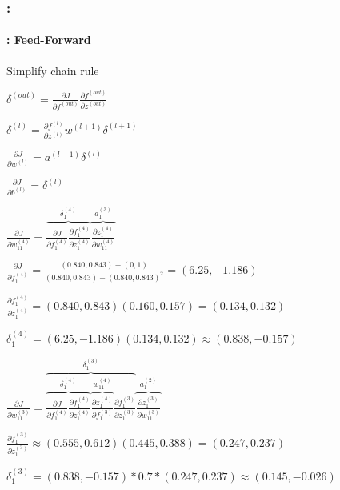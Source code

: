 \documentclass[xcolor=table]{beamer}
\begin{document}
\begin{frame}
	\frametitle{\insertshortsubtitle: \insertsection}
	\framesubtitle{\insertsubsection: Feed-Forward}
	
	\begin{minipage}{0.3\textwidth}
		\small
		
		Simplify chain rule\boldmath
		
		$ \delta^{(out)} = \frac{\partial J}{\partial f^{(out)}} \frac{\partial f^{(out)}}{\partial z^{(out)}} $
		
		$ \delta^{(l)} = \frac{\partial f^{(l)}}{\partial z^{(l)}} w^{(l+1)} \delta^{(l+1)} $
		
		$ \frac{\partial J}{\partial w^{(l)}} = a^{(l-1)} \delta^{(l)} $
		
		$ \frac{\partial J}{\partial b^{(l)}} = \delta^{(l)} $
		
	\end{minipage}
	\begin{minipage}{0.69\textwidth} 
	\end{minipage}
	
	\begin{minipage}{0.45\textwidth} 
		\tiny
		$
		\frac{\partial J}{\partial w_{11}^{(4)}} = \overbrace{\frac{\partial J}{\partial f_{1}^{(4)}} \frac{\partial f_{1}^{(4)}}{\partial z_{1}^{(4)}}}^{\delta_{1}^{(4)}} \overbrace{\frac{\partial z_{1}^{(4)}}{\partial w_{11}^{(4)}}}^{a_{1}^{(3)}}
		$
		
		$ 
		\frac{\partial J}{\partial f_{1}^{(4)}} = \frac{(0.840, 0.843) - (0, 1)}{(0.840, 0.843) - (0.840, 0.843)^2} 
		= (6.25, -1.186)
		$
		
		$ 
		\frac{\partial f_{1}^{(4)}}{\partial z_{1}^{(4)}} = (0.840, 0.843) (0.160, 0.157) = (0.134, 0.132)
		$
		
		$
		\delta_{1}^{(4)} = (6.25, -1.186) (0.134, 0.132) \approx (0.838, -0.157)
		$ 
	\end{minipage}
	\begin{minipage}{0.54\textwidth} 
		\tiny
		$
		\frac{\partial J}{\partial w_{11}^{(3)}} = 
		\overbrace{
			\overbrace{
				\frac{\partial J}{\partial f_{1}^{(4)}} 
				\frac{\partial f_{1}^{(4)}}{\partial z_{1}^{(4)}}
			}^{\delta_{1}^{(4)}} 
			\overbrace{
				\frac{\partial z_{1}^{(4)}}{\partial f_{1}^{(3)}}
			}^{w_{11}^{(4)}} 
			\frac{\partial f_{1}^{(3)}}{\partial z_{1}^{(3)}} 
		}^{\delta_{1}^{(3)}} 
		\overbrace{
			\frac{\partial z_{1}^{(3)}}{\partial w_{11}^{(3)}}
		}^{a_{1}^{(2)}}
		$
		
		$
		\frac{\partial f_{1}^{(3)}}{\partial z_{1}^{(3)}} \approx 
		(0.555, 0.612) (0.445, 0.388) = (0.247, 0.237)
		$
		
		$
		\delta_{1}^{(3)} = (0.838, -0.157) * 0.7 * (0.247, 0.237) \approx (0.145, -0.026)
		$
	\end{minipage}
	
	
\end{frame}
\end{document}
